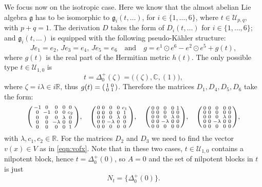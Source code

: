\documentclass{article}
\theoremstyle{definition}
\newcommand{\R}{\mathbb{R}}
\newcommand{\C}{\mathbb{C}}
\newcommand{\frg}{\mathfrak{g}}
\newcommand{\lie}[1]{\mathfrak{#1}}
\newcommand{\g}{\lie g}
\newenvironment{smallpmatrix}{\left(\begin{smallmatrix}}{\end{smallmatrix}\right)}
\begin{document}
We focus now on the isotropic case. Here we know that the almost abelian Lie algebra $\frg$ has to be isomorphic to $\g_i(t,\dots)$, for $i\in\{1,\ldots,6\}$, where $t\in\mathcal{U}_{p,q}$, with $p+q=1$. The derivation $D$ takes the form of $D_i(t,\dots)$ for $i\in\{1,\ldots,6\}$; and $\frg_i(t,\dots)$ is equipped with the following pseudo-Kähler structure: \begin{equation}\label{eqn:Jgisotropic6}
    Je_1=e_2,\,Je_3=e_4,\,Je_5=e_6\quad\text{and}\quad g=e^1\odot e^6-e^2\odot e^5+g(t),
\end{equation} where $g(t)$ is the real part of the Hermitian metric $h(t)$. The only possible type $t\in\mathcal{U}_{1,0}$ is $$t=\Delta_0^+(\zeta)=\big((\zeta),\C,(1)\big),$$ where $\zeta=i\lambda\in i\R$, thus $g(t)=\begin{smallpmatrix}
    1&0\\
    0&1
\end{smallpmatrix}$. Therefore the matrices $D_1,D_4,D_5,D_6$ take the form: \begin{equation}\label{6d_iso_D1456}
    \begin{smallpmatrix}
        -1 & 0 & 0 & 0 & 0 \\
        0 & -1 & 0 & 0 & c_{2} \\
        0 & 0 & 0 & \lambda & 0 \\
        0 & 0 & -\lambda & 0 & 0 \\
        0 & 0 & 0 & 0 & 1
    \end{smallpmatrix},\quad\begin{smallpmatrix}
        0 & 0 & 0 & 0 & c_{1} \\
        0 & 0 & 0 & 0 & 1 \\
        0 & 0 & 0 & \lambda & 0 \\
        0 & 0 & -\lambda & 0 & 0 \\
        0 & 0 & 0 & 0 & 0
    \end{smallpmatrix},\quad\begin{smallpmatrix}
        0 & 0 & 0 & 0 & 1 \\
        0 & 0 & 0 & 0 & 0 \\
        0 & 0 & 0 & \lambda & 0 \\
        0 & 0 & -\lambda & 0 & 0 \\
        0 & 0 & 0 & 0 & 0
    \end{smallpmatrix},\quad\begin{smallpmatrix}
        0 & 0 & 0 & 0 & 0 \\
        0 & 0 & 0 & 0 & 0 \\
        0 & 0 & 0 & \lambda & 0 \\
        0 & 0 & -\lambda & 0 & 0 \\
        0 & 0 & 0 & 0 & 0
    \end{smallpmatrix},
\end{equation} with $\lambda,c_1,c_2\in\R$. For the matrices $D_2$ and $D_3$ we need to find the vector $v(x)\in V$ as in \eqref{eqn:vofx}. Note that in these two cases, $t\in\mathcal{U}_{1,0}$ contains a nilpotent block, hence $t=\Delta_0^+(0)$, so $A=0$ and the set of nilpotent blocks in $t$ is just $$N_t=\{\Delta_0^+(0)\}.$$
\end{document}
